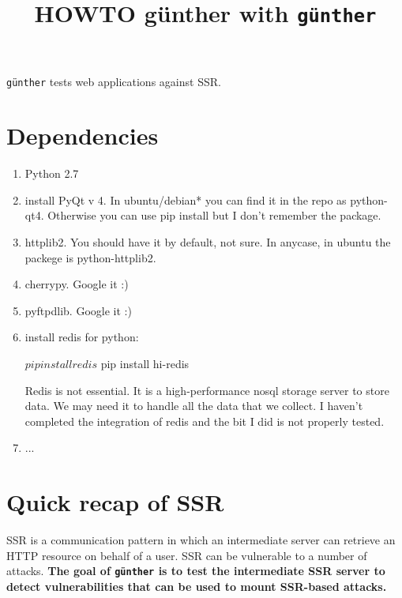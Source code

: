 \documentclass[10pt,a4paper]{article}
\newcommand{\g}{\texttt{g\"{u}nther}}
\begin{document}
\title{HOWTO g\"{u}nther with \g{}}

\maketitle

 
\g{} tests web applications against SSR. 

\section{Dependencies}

\begin{enumerate}
   \item Python 2.7

   \item install PyQt v 4. In ubuntu/debian* you can find it in the repo as 
   python-qt4. Otherwise you can use pip install but I don't remember the 
   package.

   \item httplib2. You should have it by default, not sure. In anycase, in ubuntu the
   packege is python-httplib2.

   \item cherrypy. Google it :)

   \item pyftpdlib. Google it :)

   \item install redis for python:
 
   $ pip install redis
   $ pip install hi-redis

   Redis is not essential. It is a high-performance nosql storage server to 
   store data. We may need it to handle all the data that we collect. I haven't 
   completed the integration of redis and the bit I did is not properly tested.

   \item ... 
\end{enumerate}

\section{Quick recap of SSR}

SSR is a communication pattern in which an intermediate server can retrieve an HTTP resource on behalf of a user. SSR can be vulnerable to a number of attacks. \textbf{The goal of \g{} is to test the intermediate SSR server to detect vulnerabilities that can be used to mount SSR-based attacks.}
\end{document}

